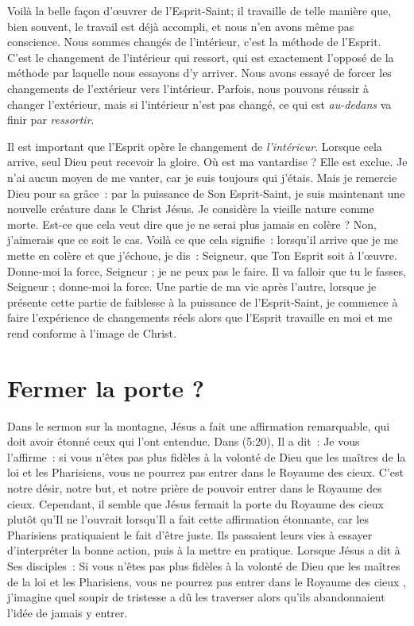 Voilà la belle façon d'œuvrer de l'Esprit-Saint;
 il travaille de telle manière que, bien souvent,
 le travail est déjà accompli, et nous n'en avons même pas conscience.
 Nous sommes changés de l'intérieur, c'est la méthode de l'Esprit.
 C'est le changement de l'intérieur qui ressort,
 qui est exactement l'opposé de la méthode par laquelle
 nous essayons d'y arriver.
 Nous avons essayé de forcer les changements de l'extérieur
 vers l'intérieur.
 Parfois, nous pouvons réussir à changer l'extérieur,
 mais si l'intérieur n'est pas changé,
 ce qui est \emph{au-dedans} va finir par \emph{ressortir}.

Il est important que l'Esprit opère le changement de \emph{l'intérieur}.
 Lorsque cela arrive, seul Dieu peut recevoir la gloire.
 Où est ma vantardise ? Elle est exclue.
 Je n'ai aucun moyen de me vanter, car je suis toujours qui j'étais.
 Mais je remercie Dieu pour sa grâce~: par la puissance de Son Esprit-Saint,
 je suis maintenant une nouvelle créature dans le Christ Jésus.
 Je considère la vieille nature comme morte.
 Est-ce que cela veut dire que je ne serai plus jamais en colère ?
 Non, j'aimerais que ce soit le cas.
 Voilà ce que cela signifie~: lorsqu'il arrive que je me mette en colère
 et que j'échoue, je dis~:
 \og Seigneur, que Ton Esprit soit à l'œuvre. Donne-moi la force,
 Seigneur ; je ne peux pas le faire. Il va falloir que tu le fasses,
 Seigneur ; donne-moi la force. \fg{}
 Une partie de ma vie après l'autre, lorsque je présente cette partie
 de faiblesse à la puissance de l'Esprit-Saint, je commence à faire
 l'expérience de changements réels alors que l'Esprit travaille en moi
 et me rend conforme à l'image de Christ.


\section*{Fermer la porte ?}

Dans le sermon sur la montagne, Jésus a fait une affirmation remarquable,
 qui doit avoir étonné ceux qui l'ont entendue.
 Dans (5:20), Il a dit~:
 \og Je vous l'affirme~:
 si vous n'êtes pas plus fidèles à la volonté de Dieu
 que les maîtres de la loi et les Pharisiens,
 vous ne pourrez pas entrer dans le Royaume des cieux. \fg{}
 C'est notre désir, notre but, et notre prière de pouvoir entrer
 dans le Royaume des cieux.
 Cependant, il semble que Jésus fermait la porte du Royaume des cieux
 plutôt qu'Il ne l'ouvrait lorsqu'Il a fait cette affirmation étonnante,
 car les Pharisiens pratiquaient le fait d'être juste.
 Ils passaient leurs vies à essayer d'interpréter la bonne action,
 puis à la mettre en pratique.
 Lorsque Jésus a dit à Ses disciples~:
 \og Si vous n'êtes pas plus fidèles à la volonté de Dieu que
 les maîtres de la loi et les Pharisiens, vous ne pourrez pas
 entrer dans le Royaume des cieux \fg{}, j'imagine quel soupir de tristesse
 a dû les traverser alors qu'ils abandonnaient
 l'idée de jamais y entrer.

